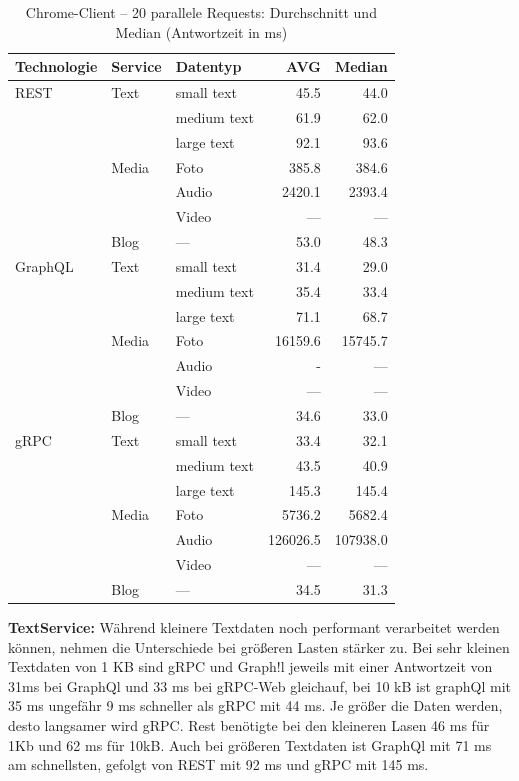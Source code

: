 \begin{table}[h]
	\centering
	\caption{Chrome-Client – 20 parallele Requests: Durchschnitt und Median (Antwortzeit in ms)}
	\label{tab:chrome-20req}
	\renewcommand{\arraystretch}{1.1}
	\begin{tabular}{|l|l|l|r|r|}
		\hline
		\textbf{Technologie} & \textbf{Service} & \textbf{Datentyp} & \textbf{AVG} & \textbf{Median} \\
		\hline
		REST & Text  & small text  & 45.5 & 44.0 \\
		&       & medium text & 61.9 & 62.0 \\
		&       & large text  & 92.1 & 93.6 \\
		& Media & Foto        & 385.8 & 384.6 \\
		&       & Audio       & 2420.1 & 2393.4 \\
		&       & Video       & — & — \\
		& Blog  & —           & 53.0 & 48.3 \\
		\hline
		GraphQL & Text  & small text  & 31.4 & 29.0 \\
		&       & medium text & 35.4 & 33.4 \\
		&       & large text  & 71.1 & 68.7 \\
		& Media & Foto        & 16159.6 & 15745.7 \\
		&       & Audio       & - & — \\
		&       & Video       & — & — \\
		& Blog  & —           & 34.6 & 33.0 \\
		\hline
		gRPC & Text  & small text  & 33.4 & 32.1 \\
		&       & medium text & 43.5 & 40.9 \\
		&       & large text  & 145.3 & 145.4 \\
		& Media & Foto        & 5736.2 & 5682.4 \\
		&       & Audio       & 126026.5 & 107938.0 \\
		&       & Video       & — & — \\
		& Blog  & —           & 34.5 & 31.3 \\
		\hline
	\end{tabular}
\end{table}

\clearpage
\textbf{TextService:}  
Während kleinere Textdaten noch performant verarbeitet werden können, nehmen die Unterschiede bei größeren Lasten stärker zu. Bei sehr kleinen Textdaten von 1 KB sind gRPC und Graph!l jeweils mit einer Antwortzeit von 31ms bei GraphQl und 33 ms bei gRPC-Web gleichauf, bei 10 kB ist graphQl mit 35 ms ungefähr 9 ms schneller als gRPC mit 44 ms. Je größer die Daten werden, desto langsamer wird gRPC. Rest benötigte bei den kleineren Lasen 46 ms für 1Kb und 62 ms für 10kB. Auch bei größeren Textdaten ist GraphQl mit 71 ms am schnellsten, gefolgt von REST mit 92 ms und gRPC mit 145 ms. 

